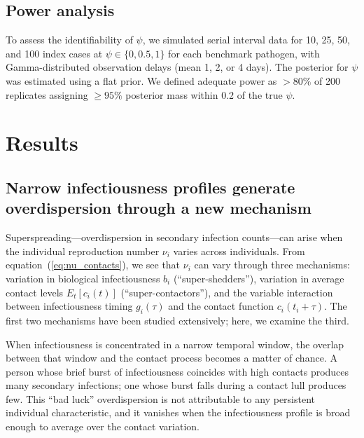 \documentclass[10pt]{article}
\begin{document}
\subsection{Power analysis}

To assess the identifiability of $\psi$, we simulated serial interval data for 10, 25, 50, and 100 index cases at $\psi \in \{0, 0.5, 1\}$ for each benchmark pathogen, with Gamma-distributed observation delays (mean 1, 2, or 4 days). The posterior for $\psi$ was estimated using a flat prior. We defined adequate power as $>80\%$ of 200 replicates assigning $\geq 95\%$ posterior mass within 0.2 of the true $\psi$.


\section{Results}

\subsection{Narrow infectiousness profiles generate overdispersion through a new mechanism}

Superspreading---overdispersion in secondary infection counts---can arise when the individual reproduction number $\nu_i$ varies across individuals. From equation~(\ref{eq:nu_contacts}), we see that $\nu_i$ can vary through three mechanisms: variation in biological infectiousness $b_i$ (``super-shedders''), variation in average contact levels $E_t[c_i(t)]$ (``super-contactors''), and the variable interaction between infectiousness timing $g_i(\tau)$ and the contact function $c_i(t_i + \tau)$. The first two mechanisms have been studied extensively; here, we examine the third.

When infectiousness is concentrated in a narrow temporal window, the overlap between that window and the contact process becomes a matter of chance. A person whose brief burst of infectiousness coincides with high contacts produces many secondary infections; one whose burst falls during a contact lull produces few. This ``bad luck'' overdispersion is not attributable to any persistent individual characteristic, and it vanishes when the infectiousness profile is broad enough to average over the contact variation.
\end{document}
